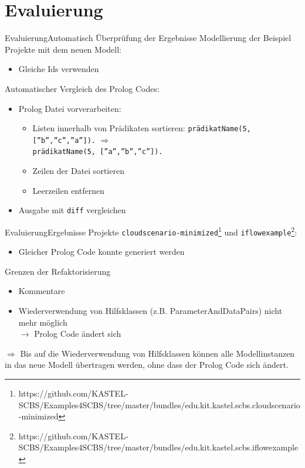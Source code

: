 \documentclass{sdqbeamer}
\begin{document}
\section{Evaluierung}
\begin{frame}{Evaluierung}{Automatisch Überprüfung der Ergebnisse}
	Modellierung der Beispiel Projekte mit dem neuen Modell:
	\begin{itemize}
		\item Gleiche Ids verwenden
	\end{itemize}
\vspace{0.05\textheight}
	Automatischer Vergleich des Prolog Codes:
	\begin{itemize}
		\item Prolog Datei vorverarbeiten:
		\begin{itemize}
			\item Listen innerhalb von Prädikaten sortieren:
			\hspace{0.05\textwidth}\texttt{prädikatName(5, [''b'',''c'',''a'']).} $\Rightarrow$ \\ \hspace{0.394\textwidth} \texttt{prädikatName(5, [''a'',''b'',''c'']).}
			\item Zeilen der Datei sortieren
			\item Leerzeilen entfernen
		\end{itemize}
		\item Ausgabe mit \texttt{diff} vergleichen
	\end{itemize}
\end{frame}
\begin{frame}{Evaluierung}{Ergebnisse}
		Projekte \texttt{cloudscenario-minimized}\footnote{https://github.com/KASTEL-SCBS/Examples4SCBS/tree/master/bundles/edu.kit.kastel.scbs.cloudscenario-minimized} und \texttt{iflowexample}\footnote{https://github.com/KASTEL-SCBS/Examples4SCBS/tree/master/bundles/edu.kit.kastel.scbs.iflowexample}:
		\begin{itemize}
			\item Gleicher Prolog Code konnte generiert werden
		\end{itemize}
		\vspace{0.05\textheight}
		Grenzen der Refaktorisierung
		\begin{itemize}
			\item Kommentare
			\item Wiederverwendung von Hilfsklassen (z.B. ParameterAndDataPairs) nicht mehr möglich\\ $\rightarrow$ Prolog Code ändert sich
		\end{itemize}
	$\Rightarrow$ Bis auf die Wiederverwendung von Hilfsklassen können alle Modellinstanzen in das neue Modell übertragen werden, ohne dass der Prolog Code sich ändert.
\end{frame}
\end{document}
